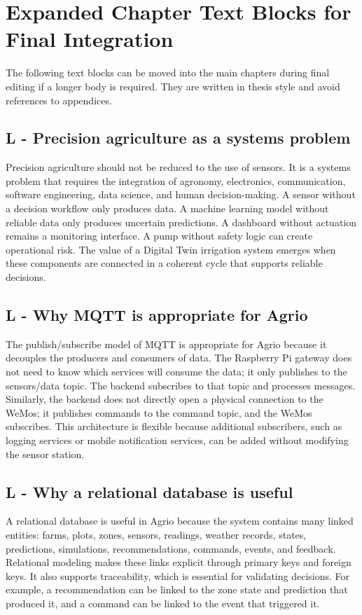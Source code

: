 \chapter{Expanded Chapter Text Blocks for Final Integration}

The following text blocks can be moved into the main chapters during final editing if a longer body is required. They are written in thesis style and avoid references to appendices.

\section{L - Precision agriculture as a systems problem}

Precision agriculture should not be reduced to the use of sensors. It is a systems problem that requires the integration of agronomy, electronics, communication, software engineering, data science, and human decision-making. A sensor without a decision workflow only produces data. A machine learning model without reliable data only produces uncertain predictions. A dashboard without actuation remains a monitoring interface. A pump without safety logic can create operational risk. The value of a Digital Twin irrigation system emerges when these components are connected in a coherent cycle that supports reliable decisions.

\section{L - Why MQTT is appropriate for Agrio}

The publish/subscribe model of MQTT is appropriate for Agrio because it decouples the producers and consumers of data. The Raspberry Pi gateway does not need to know which services will consume the data; it only publishes to the sensors/data topic. The backend subscribes to that topic and processes messages. Similarly, the backend does not directly open a physical connection to the WeMos; it publishes commands to the command topic, and the WeMos subscribes. This architecture is flexible because additional subscribers, such as logging services or mobile notification services, can be added without modifying the sensor station.

\section{L - Why a relational database is useful}

A relational database is useful in Agrio because the system contains many linked entities: farms, plots, zones, sensors, readings, weather records, states, predictions, simulations, recommendations, commands, events, and feedback. Relational modeling makes these links explicit through primary keys and foreign keys. It also supports traceability, which is essential for validating decisions. For example, a recommendation can be linked to the zone state and prediction that produced it, and a command can be linked to the event that triggered it.

